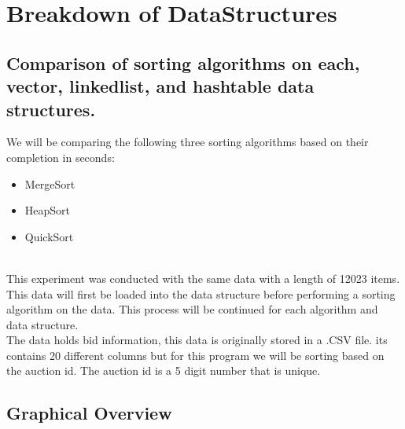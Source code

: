 \documentclass[12pt]{article}
\begin{document}
\section*{Breakdown of DataStructures}

\subsection*{Comparison of sorting algorithms on each, vector, linkedlist, and hashtable data structures.\\}


\small We will be comparing the following three sorting algorithms based on their completion in seconds:\\

\begin{itemize}
	\item MergeSort
	\item HeapSort
	\item QuickSort\\\\
\end{itemize}

\small This experiment was conducted with the same data with a length of 12023 items. This data will first be loaded into the data structure before performing a sorting algorithm on the data. This process will be continued for each algorithm and data structure.\\

\small The data holds bid information, this data is originally stored in a .CSV file. its contains 20 different columns but for this program we will be sorting based on the auction id. The auction id is a 5 digit number that is unique.

\subsection*{\small Graphical Overview}
\end{document}
